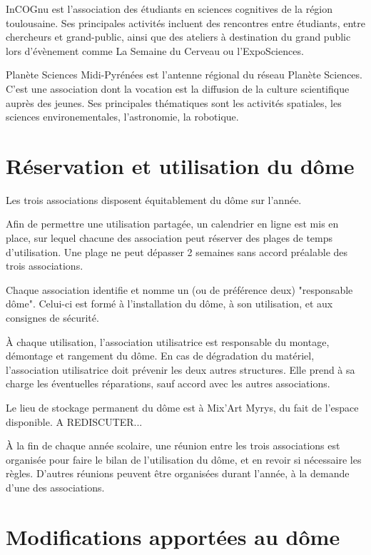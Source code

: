 \documentclass[a4paper,12pt]{article}
\begin{document}
InCOGnu est l'association des étudiants en sciences cognitives de la région
toulousaine. Ses principales activités incluent des rencontres entre étudiants,
entre chercheurs et grand-public, ainsi que des ateliers à destination du grand
public lors d'évènement comme La Semaine du Cerveau ou l'ExpoSciences.

Planète Sciences Midi-Pyrénées est l'antenne régional du réseau Planète
Sciences. C'est une association dont la vocation est la diffusion de la culture
scientifique auprès des jeunes. Ses principales thématiques sont les activités
spatiales, les sciences environementales, l'astronomie, la robotique.

\section{Réservation et utilisation du dôme}

Les trois associations disposent équitablement du dôme sur l'année.

Afin de permettre une utilisation partagée, un calendrier en ligne est mis en
place, sur lequel chacune des association peut réserver des plages de temps
d'utilisation. Une plage ne peut dépasser 2 semaines sans accord préalable des
trois associations.

Chaque association identifie et nomme un (ou de préférence deux) "responsable
dôme". Celui-ci est formé à l'installation du dôme, à son utilisation, et aux
consignes de sécurité.

À chaque utilisation, l'association utilisatrice est responsable du montage,
démontage et rangement du dôme. En cas de dégradation du matériel,
l'association utilisatrice doit prévenir les deux autres structures. Elle prend
à sa charge les éventuelles réparations, sauf accord avec les autres
associations.

Le lieu de stockage permanent du dôme est à Mix'Art Myrys, du fait de l'espace
disponible. A REDISCUTER...

À la fin de chaque année scolaire, une réunion entre les trois associations est
organisée pour faire le bilan de l'utilisation du dôme, et en revoir si
nécessaire les règles. D'autres réunions peuvent être organisées durant
l'année, à la demande d'une des associations.

\section{Modifications apportées au dôme}
\end{document}
